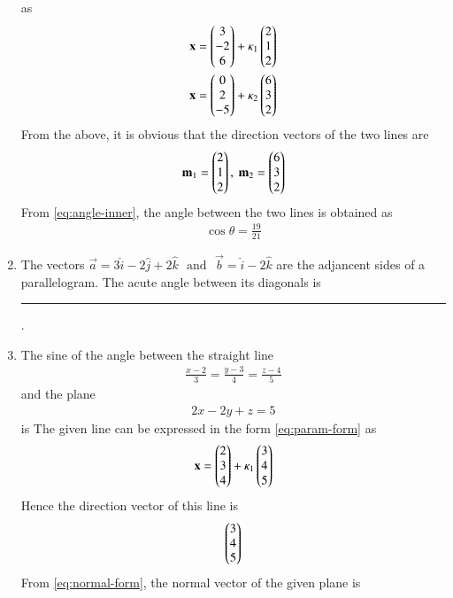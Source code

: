 \begin{enumerate}[label=\thesubsection.\arabic*, ref=\thesubsection.\theenumi]
	as
\begin{align}
	\mathbf{x} = \begin{pmatrix}3 \\ -2 \\ 6\end{pmatrix} + \kappa_1 \begin{pmatrix}2 \\ 1 \\ 2\end{pmatrix}
	\\
	\mathbf{x} = \begin{pmatrix}0 \\ 2 \\ -5 \end{pmatrix} + \kappa_2 \begin{pmatrix}6 \\ 3 \\ 2\end{pmatrix}
\end{align}
From the above,  it is obvious that the direction vectors of the two lines are
\begin{align}
\mathbf{m}_1 =\begin{pmatrix}2 \\ 1 \\ 2\end{pmatrix}, \
	\mathbf{m}_2=\begin{pmatrix}6 \\ 3 \\ 2\end{pmatrix}
\end{align}
	From \eqref{eq:angle-inner},  the angle between the two lines is  obtained as
\begin{align}
	\cos \theta = \frac{19}{21}
\end{align}
\item The vectors $\vec{a}=3\hat{i}-2\hat{j}+2\hat{k}$ $\text{ and }$ $\vec{b}=\hat{i}-2\hat{k}$ are the adjancent sides of a parallelogram. The acute angle between its diagonals is \rule{1cm}{0.15mm}.
\item The sine of the angle between the straight line 
\begin{align}
	\frac{x-2}{3}=\frac{y-3}{4}=\frac{z-4}{5} 
\end{align}
and the plane  
\begin{align}
2x-2y+z=5
\end{align}
is
\solution The given line can be expressed in the form 
	\eqref{eq:param-form}
	as
\begin{align}
	\mathbf{x} = \begin{pmatrix}2 \\ 3 \\ 4\end{pmatrix} + \kappa_1 \begin{pmatrix}3 \\ 4 \\ 5\end{pmatrix}
\end{align}
Hence the direction vector of this line is 
\begin{align}
\begin{pmatrix}3 \\ 4 \\ 5\end{pmatrix}
\end{align}
	From \eqref{eq:normal-form},  the normal vector of the given plane is 
\begin{align}

\end{align}
\end{enumerate}
